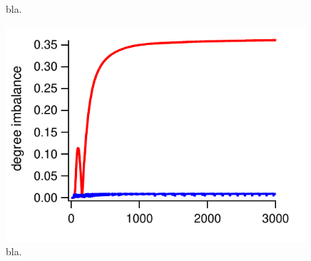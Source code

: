 \begin{figure}[!h]
\begin{minipage}[b]{0.33\textwidth}
		\caption{bla.}
		\label{fig:2db}
	\end{minipage}
	\begin{minipage}[b]{0.33\textwidth}
		\centering
		\includegraphics[width=0.99\textwidth]{pics/2dc}
		\caption{bla.}
		\label{fig:2dc}
	\end{minipage}
\end{figure}


  
